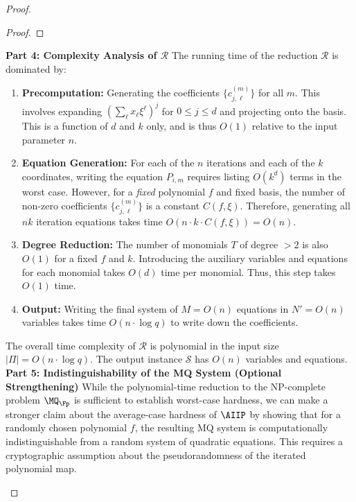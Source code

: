 \begin{proof}
\begin{proof}
                \end{proof}
            \textbf{Part 4: Complexity Analysis of $\mathcal{R}$}
                The running time of the reduction $\mathcal{R}$ is dominated by:
                \begin{enumerate}
                    \item \textbf{Precomputation:} Generating the coefficients $\{c_{j, \boldsymbol{\ell}}^{(m)}\}$ for all $m$. This involves expanding $(\sum_{\ell} x_\ell \xi^\ell)^j$ for $0 \leq j \leq d$ and projecting onto the basis. This is a function of $d$ and $k$ only, and is thus $O(1)$ relative to the input parameter $n$.
                    \item \textbf{Equation Generation:} For each of the $n$ iterations and each of the $k$ coordinates, writing the equation $P_{i,m}$ requires listing $O(k^d)$ terms in the worst case. However, for a \textit{fixed} polynomial $f$ and fixed basis, the number of non-zero coefficients $\{c_{j, \boldsymbol{\ell}}^{(m)}\}$ is a constant $C(f, \xi)$. Therefore, generating all $nk$ iteration equations takes time $O(n \cdot k \cdot C(f, \xi)) = O(n)$.
                    \item \textbf{Degree Reduction:} The number of monomials $T$ of degree $>2$ is also $O(1)$ for a fixed $f$ and $k$. Introducing the auxiliary variables and equations for each monomial takes $O(d)$ time per monomial. Thus, this step takes $O(1)$ time.
                    \item \textbf{Output:} Writing the final system of $M = O(n)$ equations in $N' = O(n)$ variables takes time $O(n \cdot \log q)$ to write down the coefficients.
                \end{enumerate}
                The overall time complexity of $\mathcal{R}$ is polynomial in the input size $|\Pi| = O(n \cdot \log q)$. The output instance $\mathcal{S}$ has $O(n)$ variables and equations.
            \textbf{Part 5: Indistinguishability of the MQ System (Optional Strengthening)}
                While the polynomial-time reduction to the NP-complete problem $\MQ_{\Fp}$ is sufficient to establish worst-case hardness, we can make a stronger claim about the average-case hardness of $\AIIP$ by showing that for a randomly chosen polynomial $f$, the resulting MQ system is computationally indistinguishable from a random system of quadratic equations.
                This requires a cryptographic assumption about the pseudorandomness of the iterated polynomial map.
                \begin{definition}

\end{definition}
\end{proof}
